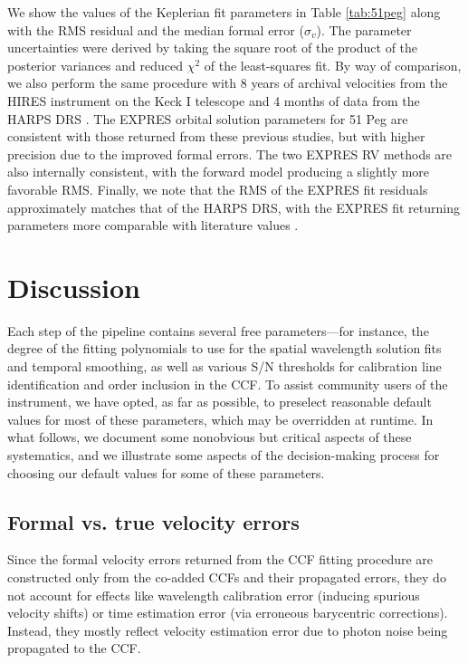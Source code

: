 We show the values of the Keplerian fit parameters in Table \ref{tab:51peg} along with the RMS residual and the median formal error ($\sigma_v$). The parameter uncertainties were derived by taking the square root of the product of the posterior variances and reduced $\chi^2$ of the least-squares fit. By way of comparison, we also perform the same procedure with 8 years of archival velocities from the HIRES instrument on the Keck I telescope \citep[corrected for instrumental systematics per][]{tal-or_correcting_2019} and 4 months of data from the HARPS DRS \citep{trifonov_public_2020}. The EXPRES orbital solution parameters for 51 Peg are consistent with those returned from these previous studies, but with higher precision due to the improved formal errors. The two EXPRES RV methods are also internally consistent, with the forward model producing a slightly more favorable RMS. Finally, we note that the RMS of the EXPRES fit residuals approximately matches that of the HARPS DRS, with the EXPRES fit returning parameters more comparable with literature values \citep{wang_eccentricity_2011, bedell_wobble_2019, wilson_first_2019}. 


\hypertarget{discussion}{%
\section{Discussion}\label{discussion}}

Each step of the pipeline contains several free parameters---for instance, the degree of the fitting polynomials to use for the spatial wavelength solution fits and temporal smoothing, as well as various S/N thresholds for calibration line identification and order inclusion in the CCF.  To assist community users of the instrument, we have opted, as far as possible, to preselect reasonable default values for most of these parameters, which may be overridden at runtime. In what follows, we document some nonobvious but critical aspects of these systematics, and we illustrate some aspects of the decision-making process for choosing our default values for some of these parameters.

\hypertarget{formal-errors}{%
\subsection{Formal vs. true velocity errors}\label{formal-errors}}

Since the formal velocity errors returned from the CCF fitting procedure are constructed only from the co-added CCFs and their propagated errors, they do not account for effects like wavelength calibration error (inducing spurious velocity shifts) or time estimation error (via erroneous barycentric corrections). Instead, they mostly reflect velocity estimation error due to photon noise being propagated to the CCF.

